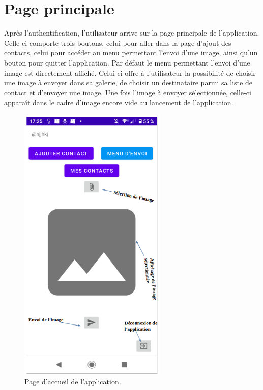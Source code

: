 \section{Page principale}    
Après l'authentification, l'utilisateur arrive sur la page principale de l'application. Celle-ci comporte trois boutons, celui pour aller dans la page d'ajout des contacts, celui pour accéder au menu permettant l'envoi d'une image, ainsi qu'un bouton pour quitter l'application. Par défaut le menu permettant l'envoi d'une image est directement affiché. Celui-ci offre à l'utilisateur la possibilité de choisir une image à envoyer dans sa galerie, de choisir un destinataire parmi sa liste de contact et d'envoyer une image. Une fois l'image à envoyer sélectionnée, celle-ci apparaît dans le cadre d'image encore vide au lancement de l'application.
 
    \begin{figure}[H]
    \begin{center}
    \includegraphics[width=7cm]{images/send_picture.png}
    \caption{Page d'accueil de l'application.}
    \end{center}
    \end{figure}
    

